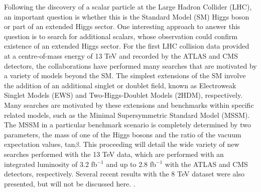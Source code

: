 Following the discovery of a scalar particle at the Large Hadron Collider (LHC), an important
question is whether this is the Standard Model (SM) Higgs boson or part of an extended Higgs
sector. One interesting approach to answer this question is to search for additional scalars,
whose observation could confirm existence of an extended Higgs sector.
For the first LHC collision data provided at a centre-of-mass energy of 13 TeV and recorded
by the ATLAS and CMS detectors, the collaborations have performed many searches that are
motivated by a variety of models beyond the SM. The simplest extensions of the SM involve the
addition of an additional singlet or doublet field, known as Electroweak Singlet Models (EWS)
and Two-Higgs-Doublet Models (2HDM), respectively. Many searches are motivated by these
extensions and benchmarks within specific related models, such as the Minimal Supersymmetric
Standard Model (MSSM). The MSSM in a particular benchmark scenario is completely
determined by two parameters, the mass of one of the Higgs bosons and the ratio of the vacuum
expectation values, tan$\beta$.
This proceeding will detail the wide variety of new searches performed with the 13 TeV
data, which are performed with an integrated luminosity of 3.2 fb$^{−1}$ and up to 2.8 fb$^{−1}$ with the
ATLAS and CMS detectors, respectively. Several recent results with the 8 TeV dataset were
also presented, but will not be discussed here.
.
